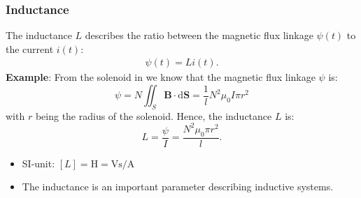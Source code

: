 \begin{frame}
	\frametitle{Inductance}
	The inductance $L$ describes the ratio between the magnetic flux linkage $\psi(t)$ to the current $i(t)$:
    \begin{align}
        \psi(t) = L i(t).
    \end{align}
    \pause
    \textbf{Example}:  From the solenoid in  we know that the magnetic flux linkage $\psi$ is:
    $$\psi = N \iint_{S} \bm{B} \cdot \mathrm{d}\bm{S}= \frac{1}{l}N^2 \mu_0 I \pi r^2 $$
    with $r$ being the radius of the solenoid. \pause Hence, the inductance $L$ is:
    $$L = \frac{\psi}{I} = \frac{N^2 \mu_0 \pi r^2}{l}.$$
    \begin{itemize}
        \item SI-unit: $[L] = \si{\henry} = \si{\volt\second\per\ampere}$
        \item The inductance is an important parameter describing inductive systems.
    \end{itemize}
\end{frame}

